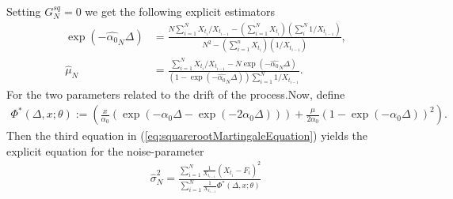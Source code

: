 Setting $G_N^{sq} = 0$ we get the following explicit estimators
\begin{align}
    \exp\left(-\hat{\alpha_0}_N\Delta\right) &= \frac{N\sum_{i=1}^{N}X_{t_i} / X_{t_{i - 1}} - \left(\sum_{i = 1}^{N}X_{t_i}\right)\left(\sum_{i}^{N}1/X_{t_{i - 1}}\right)}{N^2 - \left(\sum_{i = 1}^{n}X_{t_i}\right)\left(1/X_{t_{i - 1}}\right)},\\
    \hat{\mu}_N &= \frac{\sum_{i = 1}^{N}X_{t_i} / X_{t_{i - 1}} - N \exp\left(-\hat{\alpha_0}_N\Delta\right)}{\left(1-\exp\left(-\hat{\alpha_0}_N\Delta\right)\right)\sum_{i = 1}^{N}1/X_{t_{i - 1}}}.
\end{align}
For the two parameters related to the drift of the process.Now, define
\begin{align}
    \Phi^*(\Delta, x; \theta) := \left(\frac{x}{\alpha_0}\left(\exp\left(-\alpha_0\Delta - \exp\left(-2\alpha_0 \Delta\right)\right)\right) + \frac{\mu}{2\alpha_0}\left(1-\exp\left(-\alpha_0\Delta\right)\right)^2\right).
\end{align}
Then the third equation in (\ref{eq:squarerootMartingaleEquation}) yields the explicit equation for the noise-parameter
\begin{align}
    \hat{\sigma}^2_N = \frac{\sum_{i = 1}^{N}\frac{1}{X_{t_{i - 1}}}\left(X_{t_i} - F_i\right)^2}{\sum_{i = 1}^{N}\frac{1}{X_{t_{i - 1}}}\Phi^*(\Delta, x; \theta)}
\end{align}
